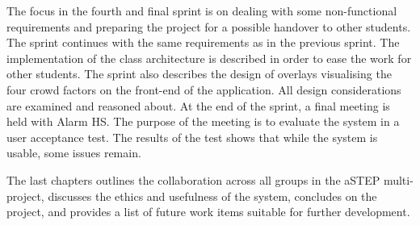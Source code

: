The focus in the fourth and final sprint is on dealing with some non-functional requirements and preparing the project for a possible handover to other students. The sprint continues with the same requirements as in the previous sprint. The implementation of the class architecture is described in order to ease the work for other students. The sprint also describes the design of overlays visualising the four crowd factors on the front-end of the application. All design considerations are examined and reasoned about. At the end of the sprint, a final meeting is held with Alarm HS. The purpose of the meeting is to evaluate the system in a user acceptance test. The results of the test shows that while the system is usable, some issues remain.

The last chapters outlines the collaboration across all groups in the aSTEP multi-project, discusses the ethics and usefulness of the system, concludes on the project, and provides a list of future work items suitable for further development.